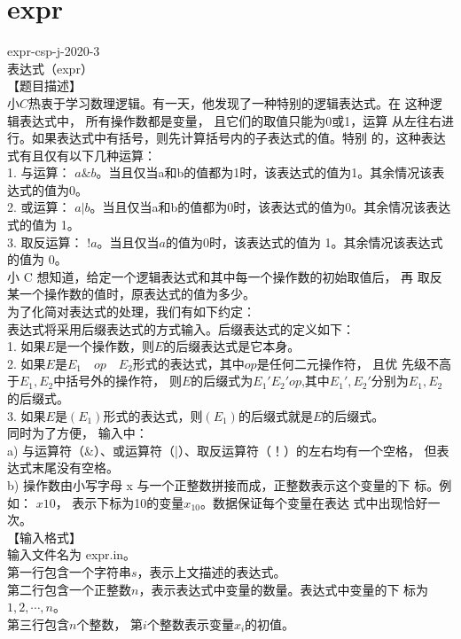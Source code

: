 \documentclass[12pt,twiside,a4paper]{ctexbook}
\numberwithin{chapter}{part}
\begin{document}
\section{expr}
expr-csp-j-2020-3\\
表达式（expr）\\
【题目描述】\\
小$C$热衷于学习数理逻辑。有一天，他发现了一种特别的逻辑表达式。在
这种逻辑表达式中， 所有操作数都是变量， 且它们的取值只能为0或1，运算
从左往右进行。如果表达式中有括号，则先计算括号内的子表达式的值。特别
的，这种表达式有且仅有以下几种运算：\\
1. 与运算： $a\&b$。当且仅当a和b的值都为1时，该表达式的值为1。其余情况该表达式的值为0。\\
2. 或运算： $a|b$。当且仅当a和b的值都为0时，该表达式的值为0。其余情况该表达式的值为 1。\\
3. 取反运算： $!a$。当且仅当$a$的值为0时，该表达式的值为 1。其余情况该表达式的值为 0。\\
小 C 想知道，给定一个逻辑表达式和其中每一个操作数的初始取值后， 再
取反某一个操作数的值时，原表达式的值为多少。\\
为了化简对表达式的处理，我们有如下约定：\\
表达式将采用后缀表达式的方式输入。后缀表达式的定义如下：\\
1. 如果$E$是一个操作数，则$E$的后缀表达式是它本身。\\
2. 如果$E$是$E_1\quad op\quad E_2$形式的表达式，其中$op$是任何二元操作符， 且优
先级不高于$E_1,E_2$中括号外的操作符， 则$E$的后缀式为${E_1}'{E_2}'op$,其中${E_1}',{E_2}'$分别为$E_1,E_2$的后缀式。\\
3. 如果$E$是$(E_1)$形式的表达式，则$(E_1)$的后缀式就是$E$的后缀式。\\
同时为了方便， 输入中：\\
a) 与运算符（\&）、或运算符（|）、取反运算符（！）的左右均有一个空格，
但表达式末尾没有空格。\\
b) 操作数由小写字母 x 与一个正整数拼接而成，正整数表示这个变量的下
标。例如： $x10$， 表示下标为10的变量$x_{10}$。数据保证每个变量在表达
式中出现恰好一次。\\
【输入格式】\\
输入文件名为 expr.in。\\
第一行包含一个字符串$s$，表示上文描述的表达式。\\
第二行包含一个正整数$n$，表示表达式中变量的数量。表达式中变量的下
标为 $1,2, \cdots , n$。\\
第三行包含$n$个整数， 第$i$个整数表示变量$x_i$的初值。\\
\end{document}
